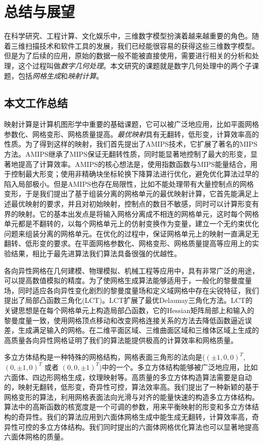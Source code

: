 ﻿\chapter{总结与展望} \label{chap:conclusion}
在科学研究、工程计算、文化娱乐中，三维数字模型扮演着越来越重要的角色。随着三维扫描技术和软件工具的发展，我们已经能很容易的获得这些三维数字模型。但是为了后续的应用，原始的数据一般不能被直接使用，需要进行相关的分析和处理，这个过程叫做\emph{数字几何处理}。本文研究的课题就是数字几何处理中的两个子课题，包括\emph{网格生成}和\emph{映射计算}。

\section{本文工作总结}
映射计算是计算机图形学中重要的基础课题，它可以被广泛地应用，比如平面网格参数化、网格变形、网格质量提高。\emph{最优映射}具有无翻转，低形变，计算效率高的性质。为了得到这样的映射，我们首先提出了AMIPS技术，它扩展了著名的MIPS 方法。AMIPS继承了MIPS保证无翻转性质，同时能显著地控制了最大的形变，显著地提高了计算效率。AMIPS的核心想法是，使用指数函数与MIPS能量结合，用于控制最大形变；使用非精确块坐标轮换下降算法进行优化，避免优化算法过早的陷入局部极小。但是AMIPS也存在局限性，比如不能处理带有大量控制点的网格变形，于是我们提出了基于组装分离的网格单元的最优映射计算，它首先能满足上述最优映射的要求，并且对初始映射，控制点的数目不敏感，同时可以计算形变有界的映射。它的基本出发点是将输入网格分离成不相连的网格单元，这时每个网格单元都是不翻转的，以每个网格单元上的仿射变换作为变量，建立一个无约束优化问题来组装分离的网格单元。在优化的过程中，保证网格单元上的映射一直满足无翻转、低形变的要求。在平面网格参数化、网格变形、网格质量提高等应用上的实验结果，相比于最先进算法我们算法具备很强的优越性。

各向异性网格在几何建模、物理模拟、机械工程等应用中，具有非常广泛的用途，可以提高数值模拟的精度。为了使网格生成算法能够适用于，一般化的黎曼度量场，同时适应各向异性变化剧烈的黎曼度量场和定义域网格中存在尖锐特征，我们提出了局部凸函数三角化(LCT)。LCT扩展了最优Delaunay三角化方法。LCT的关键思想是在每个网格单元上构造局部凸函数，它的Hessian矩阵局部上和输入的黎曼度量一致，使用网格顶点移动和改变网格连接关系的方法去降低函数逼近误差，生成满足输入的网格。在二维平面区域、三维曲面区域和三维体区域上生成的高质量各向异性网格证明了我们的算法能提供极高的计算效率和网格质量。

多立方体结构是一种特殊的网格结构，网格表面三角形的法向是($(\pm 1,0,0)^T$, $(0,\pm 1,0)^T$ 或者 $(0,0,\pm 1)^T$)中的一个。多立方体结构能够被广泛地应用，比如六面体、四边形网格生成，纹理映射等。高质量的多立方体构造算法需要是自动的，映射无翻转，低形变，奇异性可控，算法效率高。我们提出了一种新颖的基于网格变形的算法，利用网格表面法向光滑与对齐的能量快速的构造多立方体结构。算法中的高斯函数的核宽度是一个可调的参数，用来平衡映射的形变和多立方体结构的奇异性。我们的算法应用到六面体网格生成中能生成无翻转，计算效率高，奇异性可控的多立方体结构。我们同时提出的六面体网格优化算法也可以显著地提高六面体网格的质量。

